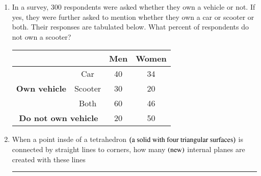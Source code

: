 \documentclass[journal]{IEEEtran}
\begin{document}
\begin{enumerate}
\item In a survey, $300$ respondents were asked whether they own a vehicle or not. If yes, they were further asked to mention whether they own a car or scooter or both. Their responses are tabulated below. What percent of respondents do not own a scooter?
\begin{table}[h!]
    \centering
    \begin{tabular}{|c|c|c|c|}
		\hline
        & & \textbf{Men} & \textbf{Women} \\
		\hline
        \multirow{3}{*}{\textbf{Own vehicle}} & Car & 40 & 34 \\
		\cline{2-4}
        & Scooter & 30 & 20 \\
		\cline{2-4}
        & Both & 60 & 46 \\
        \hline
         \multicolumn{2}{|c|}{\textbf{Do not own vehicle}} & 20 & 50 \\

        \hline
    \end{tabular}
\end{table}
\item When a point insde of a tetrahedron $\left(\text{a solid with four triangular surfaces}\right)$ is connected by straight lines to corners, how many $\left(\text{new}\right)$ internal planes are created with these lines \rule{2cm}{0.2pt}


\end{enumerate}
\end{document}
